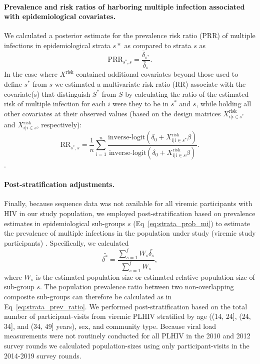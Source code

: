 \documentclass[10pt,letterpaper]{article}
\begin{document}
\paragraph{Prevalence and risk ratios of harboring multiple infection associated with epidemiological covariates.} 
We calculated a posterior estimate for the prevalence risk ratio (PRR) of multiple infections in 
epidemiological strata $s*$ as compared to strata $s$ as
\begin{equation}
    \text{PRR}_{s^*,s} = \frac{\bar{\delta}_{s^*}}{\bar{\delta}_{s}}.
    \label{eq:strata_prev_ratio}
\end{equation}
In the case where $X^{\text{risk}}$ contained additional covariates beyond those used to define $s^*$ from $s$ we estimated a multivariate risk ratio (RR) associate with the covariate(s) that distinguish $S^*$ from $S$ by calculating the ratio of the estimated risk of multiple infection for each $i$ 
were they to be in $s^*$ and $s$, while holding all other covariates at their observed values (based on the design matrices $X^\text{risk}_{i | i \in s^*}$ and $X^\text{risk}_{i | i \in s}$, respectively): 
\begin{equation}
    \text{RR}_{s^*,s} = \frac{1}{n}\sum\limits_{i=1}^n {\frac{\text{inverse-logit} \left( \delta_0 + X^\text{risk}_{i | i \in s^*} \beta \right )}{\text{inverse-logit} \left( \delta_0 + X^\text{risk}_{i | i \in s} \beta \right )}}.
\end{equation}.


\paragraph{Post-stratification adjustments.}
Finally, because sequence data was not available for all viremic participants with HIV in our study population, we employed post-stratification based on prevalence estimates in epidemiological sub-groups $s$ (Eq~\ref{eq:strata_prob_mi}) to estimate the prevalence of multiple infections in the population under study (viremic study participants) \cite{Little1993}. Specifically, we calculated
\begin{equation}
    \bar{\delta^*} = \frac{\sum\limits_{s=1}^{j}W_s\bar{\delta_{s}}}{\sum\limits_{s=1}^j W_s},
\end{equation}
where $W_s$ is the estimated population size or estimated relative population size of sub-group $s$. The population prevalence ratio between two non-overlapping composite sub-groups can therefore be calculated as in Eq~\ref{eq:strata_prev_ratio}. We performed post-stratification based on the total number of participant-visits from viremic PLHIV stratified by age ((14, 24], (24, 34], and (34, 49] years), sex, and community type. Because viral load measurements were not routinely conducted for all PLHIV in the 2010 and 2012 survey rounds we calculated population-sizes using only participant-visits in the 2014-2019 survey rounds. 
\end{document}
